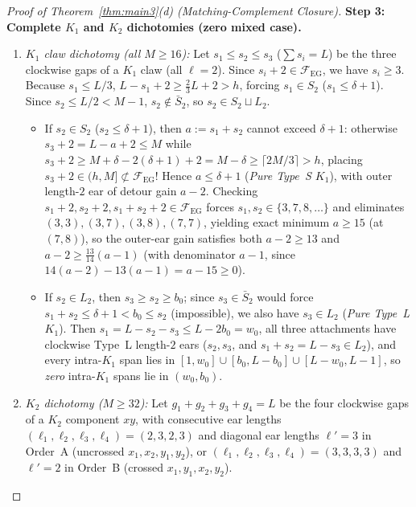 \documentclass[11pt,reqno]{amsart}
\theoremstyle{plain}
\theoremstyle{definition}
\theoremstyle{remark}
\newcommand{\FEG}{\mathcal{F}_{\mathrm{EG}}}
\DeclareRobustCommand{\_}{\ifmmode\text{\textunderscore}\else\textunderscore\allowbreak\fi}
\begin{document}
\begin{proof}[Proof of Theorem~\ref{thm:main3}(d) (Matching-Complement Closure)]
\medskip
\noindent\textbf{Step 3: Complete $K_1$ and $K_2$ dichotomies (zero mixed case).}
\begin{enumerate}[label=(\alph*),leftmargin=2em]
  \item \emph{$K_1$ claw dichotomy (all $M \ge 16$):} Let $s_1 \le s_2 \le s_3$ ($\sum s_i = L$) be the three clockwise gaps of a $K_1$ claw (all $\ell = 2$). Since $s_i + 2 \in \FEG$, we have $s_i \ge 3$. Because $s_1 \le L/3$, $L - s_1 + 2 \ge \frac{2}{3}L + 2 > h$, forcing $s_1 \in S_2$ ($s_1 \le \delta + 1$). Since $s_2 \le L/2 < M - 1$, $s_2 \notin \bar{S}_2$, so $s_2 \in S_2 \sqcup L_2$.
  \begin{itemize}[leftmargin=1.4em]
    \item If $s_2 \in S_2$ ($s_2 \le \delta + 1$), then $a := s_1 + s_2$ cannot exceed $\delta + 1$: otherwise $s_3 + 2 = L - a + 2 \le M$ while $s_3 + 2 \ge M + \delta - 2(\delta + 1) + 2 = M - \delta \ge \lceil 2M/3 \rceil > h$, placing $s_3 + 2 \in (h, M] \not\subset \FEG$! Hence $a \le \delta + 1$ (\emph{Pure Type~S $K_1$}), with outer length-$2$ ear of detour gain $a - 2$. Checking $s_1 + 2, s_2 + 2, s_1 + s_2 + 2 \in \FEG$ forces $s_1, s_2 \in \{3, 7, 8, \dots\}$ and eliminates $(3, 3), (3, 7), (3, 8), (7, 7)$, yielding exact minimum $a \ge 15$ (at $(7, 8)$), so the outer-ear gain satisfies both $a - 2 \ge 13$ and $a - 2 \ge \frac{13}{14}(a - 1)$ (with denominator $a - 1$, since $14(a - 2) - 13(a - 1) = a - 15 \ge 0$).
    \item If $s_2 \in L_2$, then $s_3 \ge s_2 \ge b_0$; since $s_3 \in \bar{S}_2$ would force $s_1 + s_2 \le \delta + 1 < b_0 \le s_2$ (impossible), we also have $s_3 \in L_2$ (\emph{Pure Type~L $K_1$}). Then $s_1 = L - s_2 - s_3 \le L - 2b_0 = w_0$, all three attachments have clockwise Type~L length-$2$ ears ($s_2, s_3$, and $s_1 + s_2 = L - s_3 \in L_2$), and every intra-$K_1$ span lies in $[1, w_0] \cup [b_0, L - b_0] \cup [L - w_0, L - 1]$, so \emph{zero} intra-$K_1$ spans lie in $(w_0, b_0)$.
  \end{itemize}
  \item \emph{$K_2$ dichotomy ($M \ge 32$):} Let $g_1 + g_2 + g_3 + g_4 = L$ be the four clockwise gaps of a $K_2$ component $xy$, with consecutive ear lengths $(\ell_1, \ell_2, \ell_3, \ell_4) = (2, 3, 2, 3)$ and diagonal ear lengths $\ell' = 3$ in Order~A (uncrossed $x_1, x_2, y_1, y_2$), or $(\ell_1, \ell_2, \ell_3, \ell_4) = (3, 3, 3, 3)$ and $\ell' = 2$ in Order~B (crossed $x_1, y_1, x_2, y_2$).
  \begin{itemize}[leftmargin=1.4em]

\end{itemize}
\end{enumerate}
\end{proof}
\end{document}
